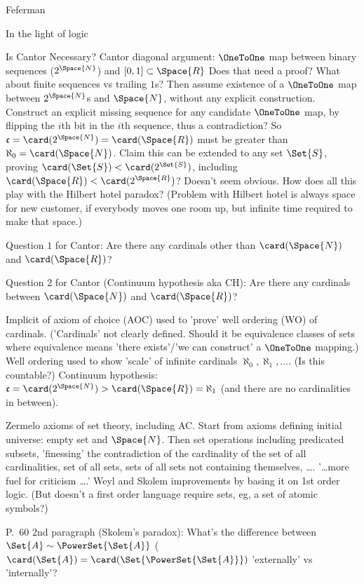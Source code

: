 \begin{plSection}{Feferman}
\begin{plSection}{In the light of logic}
\begin{plSection}{Is Cantor Necessary?}
Cantor diagonal argument:
\hfill\break
$\OneToOne$ map between binary sequences ($2^{\Space{N}}$)
and $[0,1]\subset\Space{R}$
Does that need a proof?
What about finite sequences vs trailing $1$s? 
\hfill\break
Then assume existence of a $\OneToOne$  
map between $2^{\Space{N}}$s 
and $\Space{N}$,
without any explicit construction.
Construct an explicit missing sequence 
for any candidate $\OneToOne$ map,
by flipping the $i$th bit in the $i$th sequence,
thus a contradiction?
So $\mathfrak{c} = \card(2^{\Space{N}}) 
= \card(\Space{R})$ must be greater than 
$\aleph_0 = \card(\Space{N})$. 
\hfill\break
Claim this can be extended to any set $\Set{S}$,
proving 
$\card(\Set{S}) < \card(2^{\Set{S}})$,
including 
$\card(\Space{R}) < \card(2^{\Space{R}})$?
Doesn't seem obvious.
\hfill\break
How does all this play with 
the Hilbert hotel paradox? 
(Problem with Hilbert hotel is 
always space for new customer, if everybody moves one room up,
but infinite time required to make that space.)

Question $1$ for Cantor:
\hfill\break
Are there any cardinals other than 
$\card(\Space{N})$ and 
$\card(\Space{R})$?

Question $2$ for Cantor (Continuum hypothesis aka CH):
\hfill\break
Are there any cardinals between
$\card(\Space{N})$ and 
$\card(\Space{R})$?

Implicit of axiom of choice (AOC) used to 'prove' 
well ordering (WO) of cardinals.
('Cardinals' not clearly defined.
Should it be equivalence classes of sets where
equivalence means 'there exists'/'we can construct'
a $\OneToOne$ mapping.)
\hfill\break
Well ordering used to show 'scale' of infinite cardinals
$\aleph_0, \aleph_1, \ldots$. (Is this countable?)
\hfill\break
Continuum hypothesis: 
$\mathfrak{c} = \card(2^{\Space{N}}) 
> \card(\Space{R}) = \aleph_1$
(and there are no cardinalities in between).

Zermelo axioms of set theory, including AC.
Start from axioms defining initial universe:
empty set and $\Space{N}$.
Then set operations including predicated subsets,
'finessing' the contradiction of the
cardinality of the set of all cardinalities,
set of all sets,
sets of all sets not containing themselves, 
\ldots.
\hfill\break
'\ldots more fuel for criticism \ldots.'
Weyl and Skolem improvements by basing it on 1st order logic.
(But doesn't a first order language require sets,
eg, a set of atomic symbols?)

P.~$60$ $2$nd paragraph (Skolem's paradox):
\hfill\break
What's the difference between $\Set{A} \sim \PowerSet{\Set{A}}$ 
($\card(\Set{A})=\card(\Set{\PowerSet{\Set{A}}})$
 'externally' vs 'internally'?


\end{plSection}
\end{plSection}
\end{plSection}

